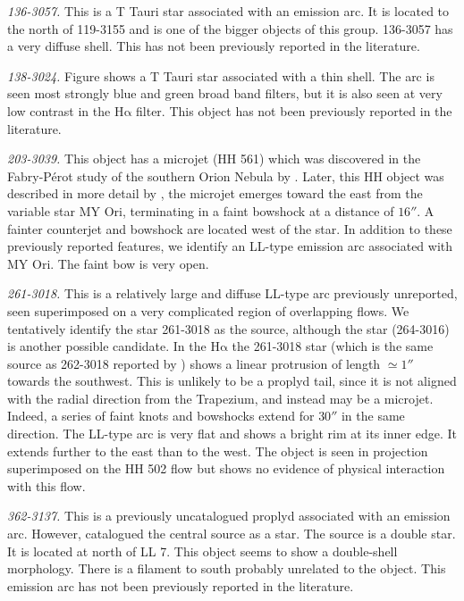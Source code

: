 \documentclass[iop, apj]{emulateapj}
\newcommand\ha{\ensuremath{\mathrm{H\alpha}}}
\begin{document}
\textit{136-3057.} This is a T Tauri star associated with an emission arc. It is located to the north of 119-3155 and is one of the bigger objects of this group. 136-3057 has a very diffuse shell. This has not been previously reported in the literature.

\textit{138-3024.} Figure shows a T Tauri star associated with a thin shell. The arc is seen most strongly blue and green broad band filters, but it is also seen at very low contrast in the \ha{} filter. This object has not been previously reported in the literature.

\textit{203-3039.} This object has a microjet (HH 561) which was discovered in the Fabry-Pérot study of the southern Orion Nebula by \citet{Bally:2001a}. Later, this HH object was described in more detail by \citet{Bally:2006a}, the microjet emerges toward the east from the variable star MY Ori, terminating in a faint bowshock at a distance of \(16''\). A fainter counterjet and bowshock are located west of the star. In addition to these previously reported features, we identify an LL-type emission arc associated with MY Ori. The faint bow is very open.

\textit{261-3018.} This is a relatively large and diffuse LL-type arc previously unreported, seen superimposed on a very complicated region of overlapping flows. We tentatively identify the star 261-3018 as the source, although the star (264-3016) is another possible candidate. In the \ha{} the 261-3018 star (which is the same source as 262-3018 reported by \citealp{Bally:2006a})  shows a linear protrusion of length \(\simeq1''\) towards the southwest. This is unlikely to be a proplyd tail, since it is not aligned with the radial direction from the Trapezium, and instead may be a microjet. Indeed, a series of faint knots and bowshocks extend for \(30''\) in the same direction. The LL-type arc is very flat and shows a bright rim at its inner edge. It extends further to the east than to the west. The object is seen in projection superimposed on the HH 502 flow but shows no evidence of physical interaction with this flow. 

\textit{362-3137.} This is a previously uncatalogued proplyd associated with an emission arc. However, \citet{Da-Rio:2009a} catalogued the central source as a star. The source is a double star. It is located at north of LL 7. This object seems to show a double-shell morphology. There is a filament to south probably unrelated to the object. This emission arc has not been previously reported in the literature. 
\end{document}
